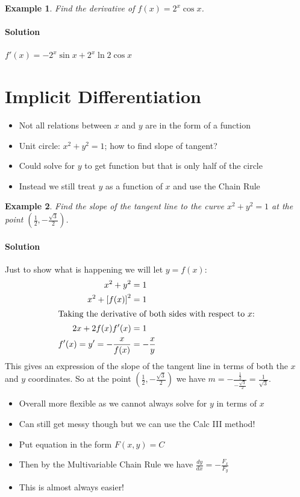 \documentclass[letterpaper, 11pt, openany]{book}
\theoremstyle{mytheoremstyle}
\theoremstyle{myexamplestyle}
\newtheorem{example}{Example}[section]
\newenvironment{solution}{\paragraph{\sffamily \smaller \fontseries{b}\selectfont Solution}}{\hfill\faSquare}
\begin{document}
\begin{example}
    Find the derivative of \(f(x) = 2^x \cos x\).
    \begin{solution}
        \(f'(x) = -2^x \sin x + 2^x \ln 2 \cos x\)
    \end{solution}
\end{example}


\section{Implicit Differentiation}

\begin{itemize}
    \item Not all relations between \(x\) and \(y\) are in the form of a function
    \item Unit circle: \(x^{2} + y^{2} = 1\); how to find slope of tangent?
    \item Could solve for \(y\) to get function but that is only half of the circle
    \item Instead we still treat \(y\) as a function of \(x\) and use the Chain Rule
\end{itemize}

\begin{example}\label{e:implicit-diff-unit-circle}
    Find the slope of the tangent line to the curve \(x^{2} + y^{2} = 1\) at the point \(\left(\frac{1}{2}, -\frac{\sqrt{3}}{2}\right)\).
\end{example}
\begin{solution}
    Just to show what is happening we will let \(y = f(x)\):
    \begin{align*}
        x^{2} + y^{2} &= 1\\
        x^{2} + \left[f(x)\right]^{2} &= 1\\
        \intertext{Taking the derivative of both sides with respect to \(x\):}
        2x + 2f(x)f'(x) &= 1\\
        f'(x) = y' = -\frac{x}{f(x)} &= -\frac{x}{y}
    \end{align*}
    This gives an expression of the slope of the tangent line in terms of both the \(x\) and \(y\) coordinates. So at the point \(\left(\frac{1}{2}, -\frac{\sqrt{3}}{2}\right)\) we have \(m = -\frac{\frac{1}{2}}{-\frac{\sqrt{3}}{2}} = \frac{1}{\sqrt{3}}\).
\end{solution}

\begin{itemize}
    \item Overall more flexible as we cannot always solve for \(y\) in terms of \(x\)
    \item Can still get messy though but we can use the Calc III method!
    \item Put equation in the form \(F(x,y) = C\)
    \item Then by the Multivariable Chain Rule we have \(\displaystyle \frac{dy}{dx} = - \frac{F_{x}}{F_{y}}\)
    \item This is almost always easier!
\end{itemize}
\end{document}
